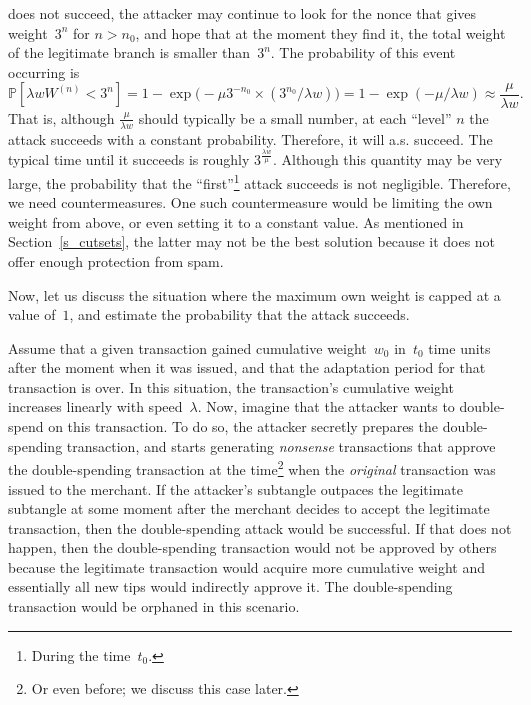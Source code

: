 \documentclass[12pt]{article}
\newcommand{\IP}{\mathbb{P}}
\begin{document}
\begin{CJK}{UTF8}{bkai}
does not succeed, the attacker may continue to look for the nonce
that gives weight~$3^n$ for $n>n_0$, and hope that at the moment
they find it, the total weight of the legitimate branch is smaller
than~$3^n$. The probability of this event occurring is
\[
 \IP[\lambda w W^{(n)}<3^n]
=1-\exp\big(-\mu 3^{-n_0}\times (3^{n_0}/\lambda w)\big)
  = 1-\exp(- \mu/\lambda w)
  \approx \frac{\mu}{\lambda w}.
\]
That is, although $\frac{\mu}{\lambda w}$ should typically
be a small number, at each ``level'' $n$ the attack succeeds with a constant
probability. Therefore, it will a.s. succeed. 
The typical time until it succeeds 
is roughly $3^\frac{\lambda w}{\mu}$. Although this quantity
may be very large, the probability that the 
``first''\footnote{During the time~$t_0$.} attack succeeds 
is not negligible. 
Therefore, we need countermeasures. One such countermeasure 
would be limiting the own weight from above, or even setting 
it to a constant value. As mentioned in Section~\ref{s_cutsets}, the 
latter may not be the best solution because it does not offer 
enough protection from spam.

\medskip

Now, let us discuss the situation
where the maximum own weight is capped at a value of~$1$,
 and estimate the probability that the attack succeeds.

Assume that a given transaction gained
 cumulative weight~$w_0$ in~$t_0$ time units after the moment
when it was issued, and
that the adaptation period for 
that transaction is over. In this situation, the transaction's
 cumulative weight
increases linearly with speed~$\lambda $. Now, 
imagine that the attacker wants to double-spend on this transaction.
To do so, the attacker secretly prepares the double-spending transaction,
 and starts generating \emph{nonsense} transactions 
that approve the double-spending transaction at the 
time\footnote{Or even before; we discuss this case later.}
 when the \emph{original} transaction was issued to the merchant.
If 
the attacker's subtangle outpaces the legitimate
subtangle at some moment after the merchant decides to accept 
the legitimate transaction, then the double-spending attack would be successful.
If that does not happen, then
the double-spending transaction 
would not be approved by others 
because the legitimate transaction would acquire more cumulative 
weight and essentially all new tips would indirectly 
approve it. The double-spending transaction would be orphaned in 
this scenario.


\end{CJK}
\end{document}
